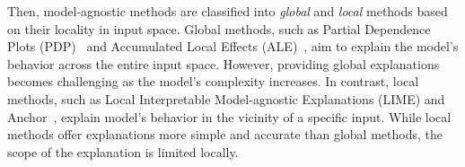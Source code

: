 \documentclass[11pt]{article}
\begin{document}
Then, model-agnostic methods are classified into
\emph{global} and \emph{local} methods based on their locality in input space.
Global methods,
such as Partial Dependence Plots (PDP)~\cite{friedman2001greedy}
and Accumulated Local Effects (ALE)~\cite{apley2020visualizing},
aim to explain the model's behavior across the entire input space.
However, providing global explanations becomes challenging
as the model's complexity increases.
In contrast, local methods,
such as Local Interpretable Model-agnostic Explanations (LIME)
\cite{ribeiro2016why}
and Anchor~\cite{ribeiro2018anchors},
explain model's behavior in the vicinity of a specific input.
While local methods offer explanations more simple and accurate
than global methods,
the scope of the explanation is limited locally.
\end{document}
